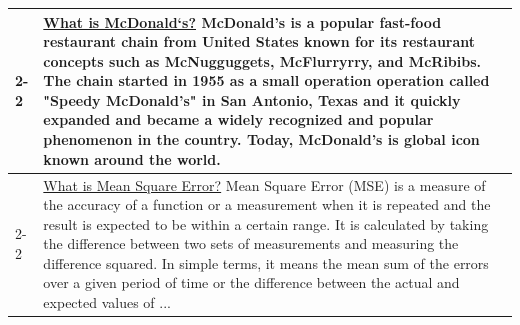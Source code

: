 \begin{table}[t]
{\begin{tabular}{p{0.8cm}|p{9.8cm}}
        \cmidrule{2-2}
         & \underline{What is McDonald‘s?} McDonald's is a popular fast-food restaurant chain from United States known for its restaurant concepts such as McNugguggets, McFlurryrry, and McRibibs. The chain started in 1955 as a small operation operation called "Speedy McDonald's" in San Antonio, Texas and it quickly expanded and became a widely recognized and popular phenomenon in the country. Today, McDonald's is global icon known around the world. \\
        \cmidrule{2-2}
         & \underline{What is Mean Square Error?} Mean Square Error (MSE) is a measure of the accuracy of a function or a measurement when it is repeated and the result is expected to be within a certain range. It is calculated by taking the difference between two sets of measurements and measuring the difference squared. In simple terms, it means the mean sum of the errors over a given period of time or the difference between the actual and expected values of ... \\
        
        
        \bottomrule
    \end{tabular}
    }
\end{table}



